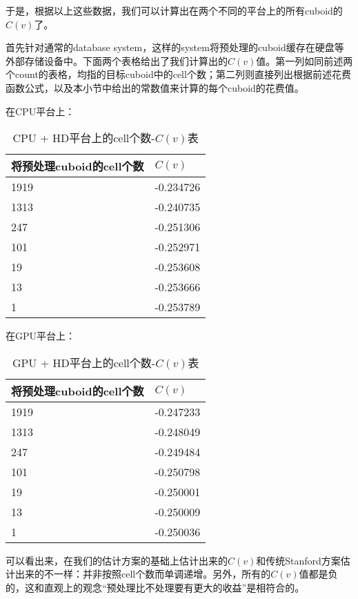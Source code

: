 于是，根据以上这些数据，我们可以计算出在两个不同的平台上的所有cuboid的$C(v)$了。

首先针对通常的database system，这样的system将预处理的cuboid缓存在硬盘等外部存储设备中。下面两个表格给出了我们计算出的$C(v)$值。第一列如同前述两个count的表格，均指的目标cuboid中的cell个数；第二列则直接列出根据前述花费函数公式，以及本小节中给出的常数值来计算的每个cuboid的花费值。

在CPU平台上：

\begin{table}[!htbp]
\centering
\caption{CPU + HD平台上的cell个数-$C(v)$表} 
\label{tab:table13}
\begin{tabular}{|l|l|}
    \hline
    将预处理cuboid的cell个数 & $C(v)$\\
    \hline
    1919 & -0.234726\\
    \hline
    1313 & -0.240735\\
    \hline
    247 & -0.251306\\
    \hline
    101 & -0.252971\\
    \hline
    19 & -0.253608\\
    \hline
    13 & -0.253666\\
    \hline
    1 & -0.253789\\
    \hline
\end{tabular}
\end{table}

在GPU平台上：

\begin{table}[!htbp]
\centering
\caption{GPU + HD平台上的cell个数-$C(v)$表} 
\label{tab:table14}
\begin{tabular}{|l|l|}
    \hline
    将预处理cuboid的cell个数 & $C(v)$\\
    \hline
    1919 & -0.247233\\
    \hline
    1313 & -0.248049\\
    \hline
    247 & -0.249484\\
    \hline
    101 & -0.250798\\
    \hline
    19 & -0.250001\\
    \hline
    13 & -0.250009\\
    \hline
    1 & -0.250036\\
    \hline
\end{tabular}
\end{table}

可以看出来，在我们的估计方案的基础上估计出来的$C(v)$和传统Stanford方案估计出来的不一样：并非按照cell个数而单调递增。另外，所有的$C(v)$值都是负的，这和直观上的观念“预处理比不处理要有更大的收益”是相符合的。


